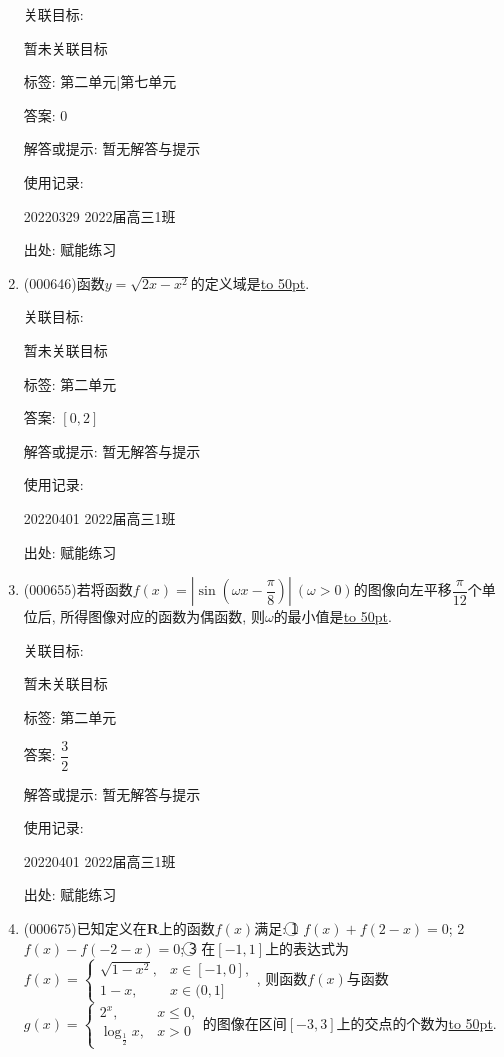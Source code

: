 \documentclass[10pt,a4paper]{article}
\newcommand{\blank}[1]{\underline{\hbox to #1pt{}}}
\begin{document}
\begin{enumerate}[1.]
关联目标:

暂未关联目标



标签: 第二单元|第七单元

答案: $0$

解答或提示: 暂无解答与提示

使用记录:

20220329	2022届高三1班	


出处: 赋能练习
\item { (000646)}函数$y=\sqrt{2x-x^2}$的定义域是\blank{50}.


关联目标:

暂未关联目标



标签: 第二单元

答案: $[0,2]$

解答或提示: 暂无解答与提示

使用记录:

20220401	2022届高三1班	


出处: 赋能练习
\item { (000655)}若将函数$f(x)=|\sin(\omega x-\dfrac{\pi}8)| \ (\omega >0)$的图像向左平移$\dfrac{\pi}{12}$个单位后, 所得图像对应的函数为偶函数, 则$\omega$的最小值是\blank{50}.


关联目标:

暂未关联目标



标签: 第二单元

答案: $\dfrac 32$

解答或提示: 暂无解答与提示

使用记录:

20220401	2022届高三1班	


出处: 赋能练习
\item { (000675)}已知定义在$\mathbf{R}$上的函数$f(x)$满足: \textcircled{1} $f(x)+f(2-x)=0$; \textcircled{2} $f(x)-f(-2-x)=0$; \textcircled{3} 在$[-1,1]$上的表达式为$f(x)=\begin{cases} \sqrt{1-x^2}, & x\in [-1,0], \\ 1-x, & x\in (0,1] \end{cases}$, 则函数$f(x)$与函数$g(x)=\begin{cases} 2^x, & x\le 0, \\ \log_{\frac12} x,& x>0 \end{cases}$的图像在区间$[-3,3]$上的交点的个数为\blank{50}.



\end{enumerate}
\end{document}
